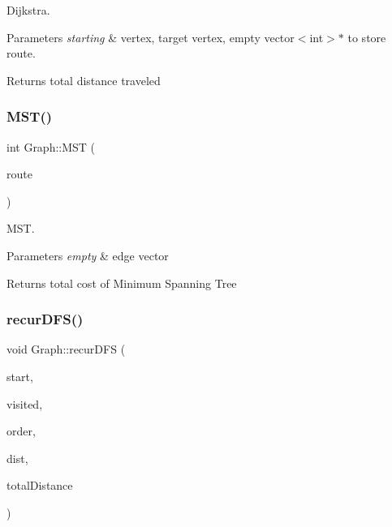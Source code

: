 Dijkstra. 


\begin{DoxyParams}{Parameters}
{\em starting} & vertex, target vertex, empty vector$<$int$>$$\ast$ to store route. \\
\hline
\end{DoxyParams}
\begin{DoxyReturn}{Returns}
total distance traveled 
\end{DoxyReturn}
\mbox{\label{class_graph_a24e43f7f7958bf9edd53f170623266ec}} 
\subsubsection{\texorpdfstring{M\+S\+T()}{MST()}}
{\footnotesize\ttfamily int Graph\+::\+M\+ST (\begin{DoxyParamCaption}\item[{std\+::vector$<$ int\+Pair $>$ $\ast$}]{route }\end{DoxyParamCaption})}



M\+ST. 


\begin{DoxyParams}{Parameters}
{\em empty} & edge vector \\
\hline
\end{DoxyParams}
\begin{DoxyReturn}{Returns}
total cost of Minimum Spanning Tree 
\end{DoxyReturn}
\mbox{\label{class_graph_a629a3606307c13695d9375a27ccb41ff}} 
\subsubsection{\texorpdfstring{recur\+D\+F\+S()}{recurDFS()}}
{\footnotesize\ttfamily void Graph\+::recur\+D\+FS (\begin{DoxyParamCaption}\item[{int}]{start,  }\item[{bool $\ast$}]{visited,  }\item[{std\+::vector$<$ int $>$ \&}]{order,  }\item[{int}]{dist,  }\item[{int \&}]{total\+Distance }\end{DoxyParamCaption})}




